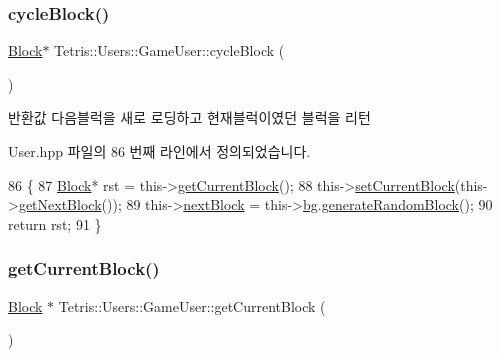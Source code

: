 \subsubsection{\texorpdfstring{cycle\+Block()}{cycleBlock()}\hspace{0.1cm}{\footnotesize\ttfamily [2/2]}}
{\footnotesize\ttfamily \hyperlink{class_tetris_1_1_block}{Block}$\ast$ Tetris\+::\+Users\+::\+Game\+User\+::cycle\+Block (\begin{DoxyParamCaption}{ }\end{DoxyParamCaption})\hspace{0.3cm}{\ttfamily [inline]}}

\begin{DoxyReturn}{반환값}
다음블럭을 새로 로딩하고 현재블럭이였던 블럭을 리턴 
\end{DoxyReturn}


User.\+hpp 파일의 86 번째 라인에서 정의되었습니다.


\begin{DoxyCode}
86                                    \{
87                      \hyperlink{class_tetris_1_1_block}{Block}* rst = this->\hyperlink{class_tetris_1_1_users_1_1_game_user_a3d4bcc74d518c28356012f8a42b85896}{getCurrentBlock}();
88                     this->\hyperlink{class_tetris_1_1_users_1_1_game_user_ae1743f8024d25ed74d7b2e456907ee41}{setCurrentBlock}(this->\hyperlink{class_tetris_1_1_users_1_1_game_user_a9300608a38f8a3b10f9d6b6bdaeaab18}{getNextBlock}());
89                     this->\hyperlink{class_tetris_1_1_users_1_1_game_user_a49be97be588cd4b6438f06ec693787d5}{nextBlock} = this->\hyperlink{class_tetris_1_1_users_1_1_game_user_ad57a39d1716322764d92ff76f08ebcd5}{bg}.\hyperlink{class_tetris_1_1_block_generator_a10dfe1467d40437ad41c5ae76437ad78}{generateRandomBlock}();
90                     \textcolor{keywordflow}{return} rst;
91                 \}
\end{DoxyCode}
\mbox{\label{class_tetris_1_1_users_1_1_game_user_a3d4bcc74d518c28356012f8a42b85896}} 
\subsubsection{\texorpdfstring{get\+Current\+Block()}{getCurrentBlock()}\hspace{0.1cm}{\footnotesize\ttfamily [1/2]}}
{\footnotesize\ttfamily \hyperlink{class_tetris_1_1_block}{Block} $\ast$ Tetris\+::\+Users\+::\+Game\+User\+::get\+Current\+Block (\begin{DoxyParamCaption}{ }\end{DoxyParamCaption})}



